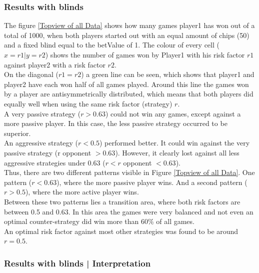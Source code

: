 \documentclass[11pt]{article}
\begin{document}
\subsubsection{Results with blinds}
The figure \ref{Topview of all Data} shows how many games player1 has won out of a total of 1000, when both players started out with an equal amount of chips (50) and a fixed blind equal to the betValue of 1. The colour of every cell ($x=r1|y=r2$) shows the number of games won by Player1 with his risk factor $r1$ against player2 with a risk factor $r2$.\\
On the diagonal ($r1=r2$) a green line can be seen, which shows that player1 and player2 have each won half of all games played. Around this line the games won by a player are antisymmetrically distributed, which means that both players did equally well when using the same risk factor (strategy) $r$.\\
%
A very passive strategy ($r > 0.63$) could not win any games, except against a more passive player. In this case, the less passive strategy occurred to be superior.\\
%
An aggressive strategy ($r < 0.5$) performed better. It could win against the very passive strategy (r opponent $> 0.63$). However, it clearly lost against all less aggressive strategies under 0.63 ($r < r$ opponent $< 0.63$).\\
Thus, there are two different patterns visible in Figure \ref{Topview of all Data}. One pattern ($r <0.63$), where the more passive player wins. And a second pattern ($r>0.5$), where the more active player wins.\\
Between these two patterns lies a transition area, where both risk factors are between 0.5 and 0.63. In this area the games were very balanced and not even an optimal counter-strategy did win more than 60\% of all games.\\
An optimal risk factor against most other strategies was found to be around $r = 0.5$. 

 \subsubsection{Results with blinds | Interpretation}
\end{document}

